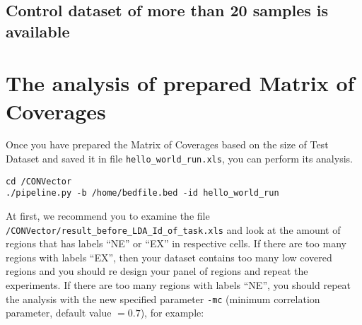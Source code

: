 \documentclass{article}
\begin{document}
\begin{usecase}
\end{usecase}


\subsection{Control dataset of more than 20 samples is available}

\begin{usecase}
\end{usecase}






\newpage

\section{The analysis of prepared Matrix of Coverages}

Once you have prepared the Matrix of Coverages based on the size of Test Dataset and saved it in file \texttt{hello\_world\_run.xls}, you can perform its analysis.

\begin{lstlisting}[style=DOS, caption={Run of the package using prepared Matrix of Coverages}]
cd /CONVector
./pipeline.py -b /home/bedfile.bed -id hello_world_run
\end{lstlisting}

At first, we recommend you to examine the file \texttt{/CONVector/result\_before\_LDA\_Id\_of\_task.xls} and look at the amount of regions that has labels ``NE'' or ``EX'' in respective cells. If there are too many regions with labels ``EX'', then your dataset contains too many low covered regions and you should re design your panel of regions and repeat the experiments. If there are too many regions with labels ``NE'', you should repeat the analysis with the new specified parameter \texttt{-mc} (minimum correlation parameter, default value $= 0.7$), for example:
\end{document}
